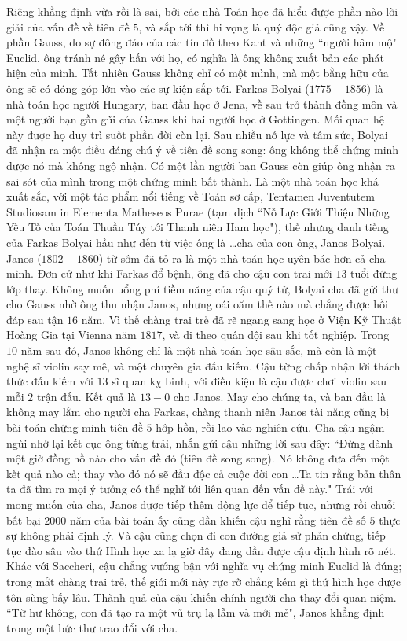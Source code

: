 \begin{multicols}{2}
	\vskip 0.1cm
	Riêng khẳng định vừa rồi là sai, bởi các nhà Toán học đã hiểu được phần nào lời giải của vấn đề về tiên đề $5$, và sắp tới thì hi vọng là quý độc giả cũng vậy. Về phần Gauss, do sự đông đảo của các tín đồ theo Kant và những ``người hâm mộ" Euclid, ông tránh né gây hấn với họ, có nghĩa là ông không xuất bản các phát hiện của mình. Tất nhiên Gauss không chỉ có một mình, mà một bằng hữu của ông sẽ có đóng góp lớn vào các sự kiện sắp tới.
	\vskip 0.1cm
	Farkas Bolyai ($1775-1856$) là nhà toán học người Hungary, ban đầu học ở Jena, về sau trở thành đồng môn và một người bạn gần gũi của Gauss khi hai người học ở Gottingen. Mối quan hệ này được họ duy trì suốt phần đời còn lại. 
	\vskip 0.1cm
	Sau nhiều nỗ lực và tâm sức, Bolyai đã nhận ra một điều đáng chú ý về tiên đề song song: ông không thể chứng minh được nó mà không ngộ nhận. Có một lần người bạn Gauss còn giúp ông nhận ra sai sót của mình trong một chứng minh bất thành. Là một nhà toán học khá xuất sắc, với một tác phẩm nổi tiếng về Toán sơ cấp, Tentamen Juventutem Studiosam in Elementa Matheseos Purae (tạm dịch ``Nỗ Lực Giới Thiệu Những Yếu Tố của Toán Thuần Túy tới Thanh niên Ham học"), thế nhưng danh tiếng của Farkas Bolyai hầu như đến từ việc ông là \ldots cha của con ông, Janos Bolyai. Janos ($1802-1860$) từ sớm đã tỏ ra là một nhà toán học uyên bác hơn cả cha mình. Đơn cử như khi Farkas đổ bệnh, ông đã cho cậu con trai mới $13$ tuổi đứng lớp thay. Không muốn uổng phí tiềm năng của cậu quý tử, Bolyai cha đã gửi thư cho Gauss nhờ ông thu nhận Janos, nhưng oái oăm thế nào mà chẳng được hồi đáp sau tận $16$ năm. Vì thế chàng trai trẻ đã rẽ ngang sang học ở Viện Kỹ Thuật Hoàng Gia tại Vienna năm $1817$, và đi theo quân đội sau khi tốt nghiệp. Trong $10$ năm sau đó, Janos không chỉ là một nhà toán học sâu sắc, mà còn là một nghệ sĩ violin say mê, và một chuyên gia đấu kiếm. Cậu từng chấp nhận lời thách thức đấu kiếm với $13$ sĩ quan kỵ binh, với điều kiện là cậu được chơi violin sau mỗi $2$ trận đấu. Kết quả là $13-0$ cho Janos.
	\vskip 0.1cm
	May cho chúng ta, và ban đầu là không may lắm cho người cha Farkas, chàng thanh niên Janos tài năng cũng bị bài toán chứng minh tiên đề $5$ hớp hồn, rồi lao vào nghiên cứu. Cha cậu ngậm ngùi nhớ lại kết cục ông từng trải, nhắn gửi cậu những lời sau đây:
	\vskip 0.1cm
	``Đừng dành một giờ đồng hồ nào cho vấn đề đó (tiên đề song song). Nó không đưa đến một kết quả nào cả; thay vào đó nó sẽ đầu độc cả cuộc đời con \ldots Ta tin rằng bản thân ta đã tìm ra mọi ý tưởng có thể nghĩ tới liên quan đến vấn đề này."
	\vskip 0.1cm
	Trái với mong muốn của cha, Janos được tiếp thêm động lực để tiếp tục, nhưng rồi chuỗi bất bại $2000$ năm của bài toán ấy cũng dần khiến cậu nghĩ rằng tiên đề số $5$ thực sự không phải định lý. Và cậu cũng chọn đi con đường giả sử phản chứng, tiếp tục đào sâu vào thứ Hình học xa lạ giờ đây đang dần được cậu định hình rõ nét. Khác với Saccheri, cậu chẳng vướng bận với nghĩa vụ chứng minh Euclid là đúng; trong mắt chàng trai trẻ, thế giới mới này rực rỡ chẳng kém gì thứ hình học được tôn sùng bấy lâu. Thành quả của cậu khiến chính người cha thay đổi quan niệm. ``Từ hư không, con đã tạo ra một vũ trụ lạ lẫm và mới mẻ", Janos khẳng định trong một bức thư trao đổi với cha. 

\end{multicols}
